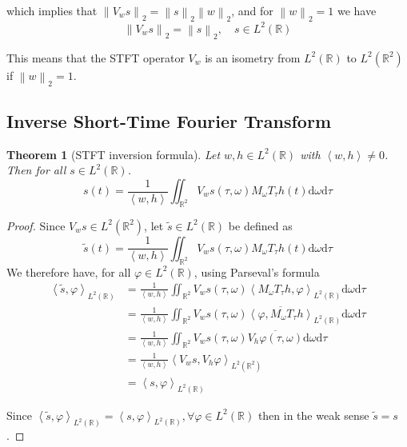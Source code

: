 \documentclass[
  american,
]{article}
\newtheorem{theorem}{Theorem}
\begin{document}
which implies that \(\left\lVert V_w s\right\rVert_2 = \left\lVert s\right\rVert_2 \left\lVert w\right\rVert_2\), and for \(\left\lVert w\right\rVert_2=1\) we have
\begin{equation}\label{eq:isometry}
\left\lVert V_w s\right\rVert_2 = \left\lVert s\right\rVert_2,\quad s\in L^2(\mathbb{R})
\end{equation}

This means that the STFT operator \(V_w\) is an isometry from \(L^2(\mathbb{R})\)
to \(L^2(\mathbb{R}^2)\) if \(\left\lVert w\right\rVert_2=1\).

\hypertarget{inverse-short-time-fourier-transform-1}{%
\subsection{Inverse Short-Time Fourier Transform}\label{inverse-short-time-fourier-transform-1}}

\begin{theorem}[STFT inversion formula]
Let \(w,h\in L^2(\mathbb{R})\) with \(\left\langle w,h\right\rangle\neq0\). Then for all \(s\in L^2(\mathbb{R})\).
\begin{equation}
s(t) = \frac{1}{\left\langle w,h\right\rangle} \iint_{\mathbb{R}^2}V_w s(\tau,\omega)M_\omega T_\tau h(t) \mathrm{d}\omega\mathrm{d}\tau
\end{equation}
\end{theorem}

\begin{proof}
Since \(V_w s\in L^2(\mathbb{R}^2)\), let \(\tilde s\in L^2(\mathbb{R})\) be defined as
\begin{equation}
\tilde s(t) = \frac{1}{\left\langle w,h\right\rangle} \iint_{\mathbb{R}^2}V_w s(\tau,\omega)M_\omega T_\tau h(t) \mathrm{d}\omega\mathrm{d}\tau
\end{equation}
We therefore have, for all \(\varphi\in L^2(\mathbb{R})\), using Parseval's formula
\begin{align}
\left\langle\tilde s, \varphi\right\rangle_{L^2(\mathbb{R})}
&= \frac{1}{\left\langle w,h\right\rangle} \iint_{\mathbb{R}^2} V_w s(\tau,\omega) \left\langle M_\omega T_\tau h, \varphi\right\rangle_{L^2(\mathbb{R})} \mathrm{d}\omega\mathrm{d}\tau\\
&= \frac{1}{\left\langle w,h\right\rangle} \iint_{\mathbb{R}^2} V_w s(\tau,\omega) \overline{\left\langle\varphi,M_\omega T_\tau h\right\rangle}_{L^2(\mathbb{R})} \mathrm{d}\omega\mathrm{d}\tau\\
&= \frac{1}{\left\langle w,h\right\rangle} \iint_{\mathbb{R}^2} V_w s(\tau,\omega) \overline{V_h \varphi(\tau,\omega)} \mathrm{d}\omega\mathrm{d}\tau\\
&= \frac{1}{\left\langle w,h\right\rangle} \left\langle V_w s, V_h \varphi\right\rangle_{L^2(\mathbb{R}^2)}\\
&= \left\langle s, \varphi\right\rangle_{L^2(\mathbb{R})}
\end{align}

Since \(\left\langle\tilde s,\varphi\right\rangle_{L^2(\mathbb{R})}=\left\langle s,\varphi\right\rangle_{L^2(\mathbb{R})},\forall\varphi\in L^2(\mathbb{R})\)
then in the weak sense \(\tilde s = s\).
\end{proof}
\end{document}
